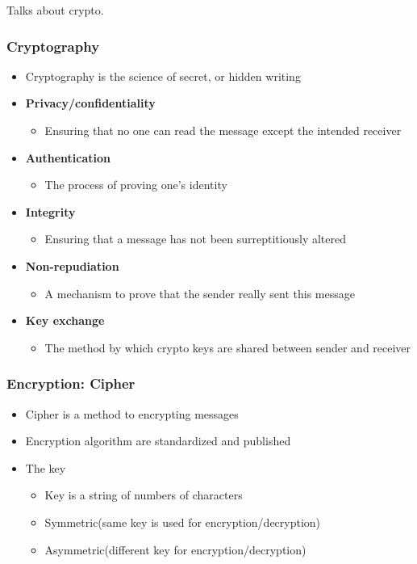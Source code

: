 \begin{frame}
Talks about crypto.
\end{frame}

\begin{frame}
    \frametitle{Cryptography}
    \begin{itemize}
        \item Cryptography is the science of secret, or hidden writing
        \item \textbf{Privacy/confidentiality}
            \begin{itemize}
                \item Ensuring that no one can read the message except the intended receiver
            \end{itemize}
        \item \textbf{Authentication}
            \begin{itemize}
                \item The process of proving one's identity
            \end{itemize}
        \item \textbf{Integrity}
            \begin{itemize}
                \item Ensuring that a message has not been surreptitiously altered
            \end{itemize}
        \item \textbf{Non-repudiation}
            \begin{itemize}
                \item A mechanism to prove that the sender really sent this message
            \end{itemize}
        \item \textbf{Key exchange}
            \begin{itemize}
                \item The method by which crypto keys are shared between sender and receiver
            \end{itemize}
    \end{itemize}
\end{frame}

\begin{frame}
    \frametitle{Encryption: Cipher}
    \begin{itemize}
        \item Cipher is a method to encrypting messages
        \item Encryption algorithm are standardized and published
        \item The key
            \begin{itemize}
                \item Key is a string of numbers of characters
                \item \alert{Symmetric}(same key is used for encryption/decryption)
                \item \alert{Asymmetric}(different key for encryption/decryption)
            \end{itemize}
    \end{itemize}
\end{frame}

